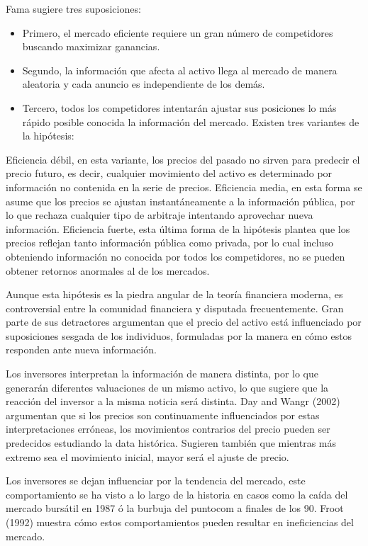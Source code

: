 \documentclass[a4paper,12pt]{Latex/Classes/PhDthesisPSnPDF}
\begin{document}
Fama sugiere tres suposiciones:
\begin{itemize}
\item Primero, el mercado eficiente requiere un gran número de competidores buscando maximizar ganancias. \item Segundo, la información que afecta al activo llega al mercado de manera aleatoria y cada anuncio es independiente de los demás.
\item Tercero, todos los competidores intentarán ajustar sus posiciones lo más rápido posible conocida la información del mercado. Existen tres variantes de la hipótesis:
\end{itemize}

Eficiencia débil, en esta variante, los precios del pasado no sirven para predecir el precio futuro, es decir, cualquier movimiento del activo es determinado por información no contenida en la serie de precios. Eficiencia media, en esta forma se asume que los precios se ajustan instantáneamente a la información pública, por lo que rechaza cualquier tipo de arbitraje intentando aprovechar nueva información. Eficiencia fuerte, esta última forma de la hipótesis plantea que los precios reflejan tanto información pública como privada, por lo cual incluso obteniendo información no conocida por todos los competidores, no se pueden obtener retornos anormales al de los mercados.

Aunque esta hipótesis es la piedra angular de la teoría financiera moderna, es controversial entre la comunidad financiera y disputada frecuentemente. Gran parte de sus detractores argumentan que el precio del activo está influenciado por suposiciones sesgada de los individuos, formuladas por la manera en cómo estos responden ante nueva información.

Los inversores interpretan la información de manera distinta, por lo que generarán diferentes valuaciones de un mismo activo, lo que sugiere que la reacción del inversor a la misma noticia será distinta. Day and Wangr (2002) argumentan que si los precios son continuamente influenciados por estas interpretaciones erróneas, los movimientos contrarios del precio pueden ser predecidos estudiando la data histórica. Sugieren también que mientras más extremo sea el movimiento inicial, mayor será el ajuste de precio.

Los inversores se dejan influenciar por la tendencia del mercado, este comportamiento se ha visto a lo largo de la historia en casos como la caída del mercado bursátil en 1987 ó la burbuja del puntocom a finales de los 90. Froot (1992) muestra cómo estos comportamientos pueden resultar en ineficiencias del mercado.
\end{document}
